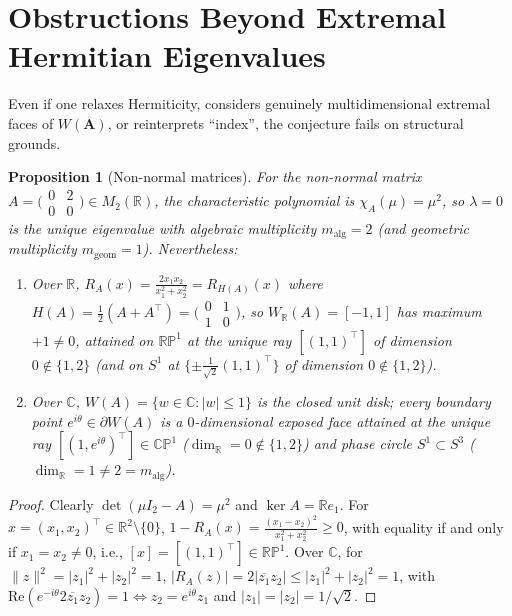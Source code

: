\documentclass[11pt,a4paper]{article}
\newcommand{\smmat}[1]{\bigl(\begin{smallmatrix}#1\end{smallmatrix}\bigr)}
\newtheorem{proposition}[theorem]{Proposition}
\theoremstyle{definition}
\theoremstyle{remark}
\newcommand{\RR}{\mathbb{R}}
\newcommand{\CC}{\mathbb{C}}
\newcommand{\RP}{\mathbb{RP}}
\newcommand{\CP}{\mathbb{CP}}
\newcommand{\re}{\mathrm{Re}}
\begin{document}
\section{Obstructions Beyond Extremal Hermitian Eigenvalues}
\label{sec:obstructions}

Even if one relaxes Hermiticity, considers genuinely multidimensional extremal faces of $W(\mathbf{A})$, or reinterprets ``index'', the conjecture fails on structural grounds.

\begin{proposition}[Non-normal matrices]
\label{prop:nonnormal}
For the non-normal matrix $A = \smmat{0 & 2 \\ 0 & 0} \in M_2(\RR)$, the characteristic polynomial is $\chi_A(\mu) = \mu^2$, so $\lambda = 0$ is the unique eigenvalue with algebraic multiplicity $m_{\mathrm{alg}} = 2$ (and geometric multiplicity $m_{\mathrm{geom}} = 1$). Nevertheless:
\begin{enumerate}
  \item[(a)] Over $\RR$, $R_A(x) = \frac{2 x_1 x_2}{x_1^2 + x_2^2} = R_{H(A)}(x)$ where $H(A) = \frac{1}{2}(A + A^\top) = \smmat{0 & 1 \\ 1 & 0}$, so $W_{\RR}(A) = [-1, 1]$ has maximum $+1 \neq 0$, attained on $\RP^1$ at the unique ray $[(1, 1)^\top]$ of dimension $0 \notin \{1, 2\}$ (and on $S^1$ at $\{\pm \frac{1}{\sqrt{2}}(1, 1)^\top\}$ of dimension $0 \notin \{1, 2\}$).
  \item[(b)] Over $\CC$, $W(A) = \{w \in \CC : |w| \le 1\}$ is the closed unit disk; every boundary point $e^{i\theta} \in \partial W(A)$ is a $0$-dimensional exposed face attained at the unique ray $[(1, e^{i\theta})^\top] \in \CP^1$ ($\dim_{\RR} = 0 \notin \{1, 2\}$) and phase circle $S^1 \subset S^3$ ($\dim_{\RR} = 1 \neq 2 = m_{\mathrm{alg}}$).
\end{enumerate}
\end{proposition}

\begin{proof}
Clearly $\det(\mu I_2 - A) = \mu^2$ and $\ker A = \RR e_1$. For $x = (x_1, x_2)^\top \in \RR^2 \setminus \{0\}$, $1 - R_A(x) = \frac{(x_1 - x_2)^2}{x_1^2 + x_2^2} \ge 0$, with equality if and only if $x_1 = x_2 \neq 0$, i.e., $[x] = [(1, 1)^\top] \in \RP^1$. Over $\CC$, for $\|z\|^2 = |z_1|^2 + |z_2|^2 = 1$, $|R_A(z)| = 2|\overline{z_1} z_2| \le |z_1|^2 + |z_2|^2 = 1$, with $\re(e^{-i\theta} 2 \overline{z_1} z_2) = 1 \iff z_2 = e^{i\theta} z_1$ and $|z_1| = |z_2| = 1/\sqrt{2}$.
\end{proof}
\end{document}
